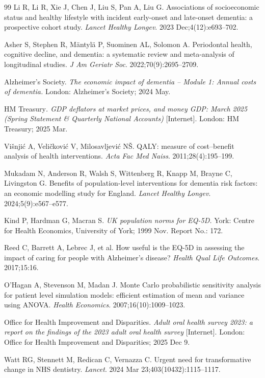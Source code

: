 \documentclass[11pt,a4paper]{article}
\begin{document}
\begin{thebibliography}{99}
 Li R, Li R, Xie J, Chen J, Liu S, Pan A, Liu G. Associations of socioeconomic status and healthy lifestyle with incident early-onset and late-onset dementia: a prospective cohort study. \textit{Lancet Healthy Longev}. 2023 Dec;4(12):e693--702.

 Asher S, Stephen R, Mäntylä P, Suominen AL, Solomon A. Periodontal health, cognitive decline, and dementia: a systematic review and meta-analysis of longitudinal studies. \textit{J Am Geriatr Soc}. 2022;70(9):2695--2709.

 Alzheimer's Society. \textit{The economic impact of dementia -- Module 1: Annual costs of dementia.} London: Alzheimer's Society; 2024 May.

 HM Treasury\textit{. GDP deflators at market prices, and money GDP: March 2025 (Spring Statement \& Quarterly National Accounts)} [Internet]. London: HM Treasury; 2025 Mar.

 Višnjić A, Veličković V, Milosavljević NŠ. QALY: measure of cost--benefit analysis of health interventions. \textit{Acta Fac Med Naiss}. 2011;28(4):195--199.

 Mukadam N, Anderson R, Walsh S, Wittenberg R, Knapp M, Brayne C, Livingston G. Benefits of population-level interventions for dementia risk factors: an economic modelling study for England. \textit{Lancet Healthy Longev}. 2024;5(9):e567--e577.

 Kind P, Hardman G, Macran S. \textit{UK population norms for EQ-5D.} York: Centre for Health Economics, University of York; 1999 Nov. Report No.: 172.

 Reed C, Barrett A, Lebrec J, et al. How useful is the EQ-5D in assessing the impact of caring for people with Alzheimer's disease? \textit{Health Qual Life Outcomes}. 2017;15:16.

 O'Hagan A, Stevenson M, Madan J. Monte Carlo probabilistic sensitivity analysis for patient level simulation models: efficient estimation of mean and variance using ANOVA. \textit{Health Economics}. 2007;16(10):1009--1023.

 Office for Health Improvement and Disparities. \textit{Adult oral health survey 2023: a report on the findings of the 2023 adult oral health survey} [Internet]. London: Office for Health Improvement and Disparities; 2025 Dec 9.

 Watt RG, Stennett M, Redican C, Vernazza C. Urgent need for transformative change in NHS dentistry. \textit{Lancet}. 2024 Mar 23;403(10432):1115--1117.


\end{thebibliography}
\end{document}
